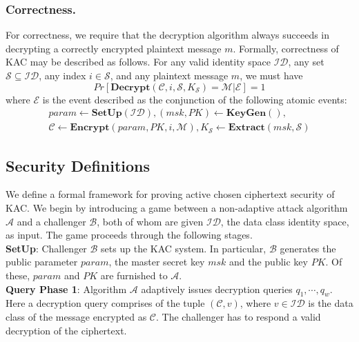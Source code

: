 \subsubsection{Correctness.} For correctness, we require that the decryption algorithm always succeeds in decrypting a correctly encrypted plaintext message $m$. Formally, correctness of KAC may be described as follows. For any valid identity space $\mathcal{ID}$, any set $\mathcal{S}\subseteq\mathcal{ID}$, any index $i\in\mathcal{S}$, and any plaintext message $m$, we must have 
\begin{equation}
 Pr[\textbf{Decrypt}(\mathcal{C},i,\mathcal{S},K_{\mathcal{S}})=\mathcal{M} |\mathcal{E}]=1\nonumber
\end{equation}
where $\mathcal{E}$ is the event described as the conjunction of the following atomic events:
\begin{equation}
\begin{split}
param\leftarrow\textbf{SetUp}(\mathcal{ID}),(msk,PK)\leftarrow\textbf{KeyGen}(),\\
\mathcal{C}\leftarrow\textbf{Encrypt}(param,PK,i,\mathcal{M}),K_{\mathcal{S}}\leftarrow\textbf{Extract}(msk,\mathcal{S})\nonumber
\end{split} 
\end{equation}


\subsection{Security Definitions}
\label{subsec:security}

We define a formal framework for proving active chosen ciphertext security of KAC. We begin by introducing a game between a non-adaptive attack algorithm $\mathcal{A}$ and a challenger $\mathcal{B}$, both of whom are given $\mathcal{ID}$, the data class identity space, as input. The game proceeds through the following stages.\\
 
\noindent\textbf{SetUp}: Challenger $\mathcal{B}$ sets up the KAC system. In particular, $\mathcal{B}$ generates the public parameter $param$, the master secret key $msk$ and the public key $PK$. Of these, $param$ and $PK$ are furnished to $\mathcal{A}$.\\
 
\noindent\textbf{Query Phase 1}: Algorithm $\mathcal{A}$ adaptively issues decryption queries $q_1,\cdots,q_w$. Here a decryption query comprises of the tuple $(\mathcal{C},v)$, where $v\in\mathcal{ID}$ is the data class of the message encrypted as $\mathcal{C}$. The challenger has to respond a valid decryption of the ciphertext.\\
 
